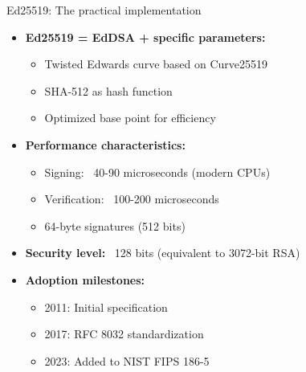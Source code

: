 \documentclass[aspectratio=169, lualatex, handout]{beamer}
\begin{document}
\begin{frame}{Ed25519: The practical implementation}
	\begin{itemize}[<+->]
		\item \textbf{Ed25519 = EdDSA + specific parameters:}
		      \begin{itemize}
			      \item Twisted Edwards curve based on Curve25519
			      \item SHA-512 as hash function
			      \item Optimized base point for efficiency
		      \end{itemize}
		\item \textbf{Performance characteristics:}
		      \begin{itemize}
			      \item Signing: ~40-90 microseconds (modern CPUs)
			      \item Verification: ~100-200 microseconds
			      \item 64-byte signatures (512 bits)
		      \end{itemize}
		\item \textbf{Security level:} ~128 bits (equivalent to 3072-bit RSA)
		\item \textbf{Adoption milestones:}
		      \begin{itemize}
			      \item 2011: Initial specification
			      \item 2017: RFC 8032 standardization
			      \item 2023: Added to NIST FIPS 186-5
		      \end{itemize}
	\end{itemize}
\end{frame}
\end{document}
